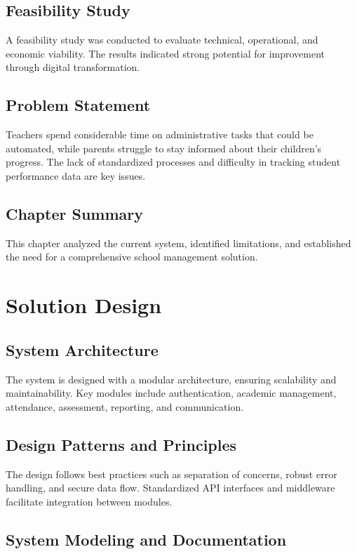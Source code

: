 \documentclass[12pt,a4paper]{report}
\begin{document}
\section{Feasibility Study}
A feasibility study was conducted to evaluate technical, operational, and economic viability. The results indicated strong potential for improvement through digital transformation.

\section{Problem Statement}
Teachers spend considerable time on administrative tasks that could be automated, while parents struggle to stay informed about their children's progress. The lack of standardized processes and difficulty in tracking student performance data are key issues.

\section{Chapter Summary}
This chapter analyzed the current system, identified limitations, and established the need for a comprehensive school management solution.

\chapter{Solution Design}
\section{System Architecture}
The system is designed with a modular architecture, ensuring scalability and maintainability. Key modules include authentication, academic management, attendance, assessment, reporting, and communication.

\section{Design Patterns and Principles}
The design follows best practices such as separation of concerns, robust error handling, and secure data flow. Standardized API interfaces and middleware facilitate integration between modules.

\section{System Modeling and Documentation}
\end{document}
